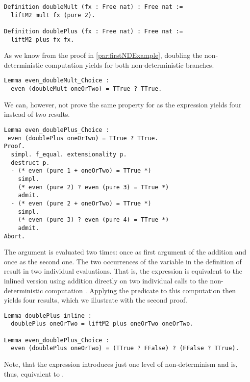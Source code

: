 \begin{verbatim}
Definition doubleMult (fx : Free nat) : Free nat :=
  liftM2 mult fx (pure 2).

Definition doublePlus (fx : Free nat) : Free nat :=
  liftM2 plus fx fx.
\end{verbatim}

As we know from the proof in \autoref{par:firstNDExample}, doubling the non-deterministic computation  yields  for both non-deterministic branches.

\begin{verbatim}
Lemma even_doubleMult_Choice :
  even (doubleMult oneOrTwo) = TTrue ? TTrue.
\end{verbatim}

We can, however, not prove the same property for  as the expression yields four instead of two results.

\begin{verbatim}
Lemma even_doublePlus_Choice :
 even (doublePlus oneOrTwo) = TTrue ? TTrue.
Proof.
  simpl. f_equal. extensionality p.
  destruct p.
  - (* even (pure 1 + oneOrTwo) = TTrue *)
    simpl.
    (* even (pure 2) ? even (pure 3) = TTrue *)
    admit.
  - (* even (pure 2 + oneOrTwo) = TTrue *)
    simpl.
    (* even (pure 3) ? even (pure 4) = TTrue *)
    admit.
Abort.
\end{verbatim}

The argument  is evaluated two times: once as first argument of the addition and once as the second one.
The two occurrences of the variable  in the definition of  result in two individual evaluations.
That is, the expression is equivalent to the inlined version using addition directly on two individual calls to the non-deterministic computation .
Applying the predicate  to this computation then yields four results, which we illustrate with the second proof.

\begin{verbatim}
Lemma doublePlus_inline :
  doublePlus oneOrTwo = liftM2 plus oneOrTwo oneOrTwo.

Lemma even_doublePlus_Choice :
  even (doublePlus oneOrTwo) = (TTrue ? FFalse) ? (FFalse ? TTrue).
\end{verbatim}

Note, that the expression  introduces just one level of non-determinism and is, thus, equivalent to .


